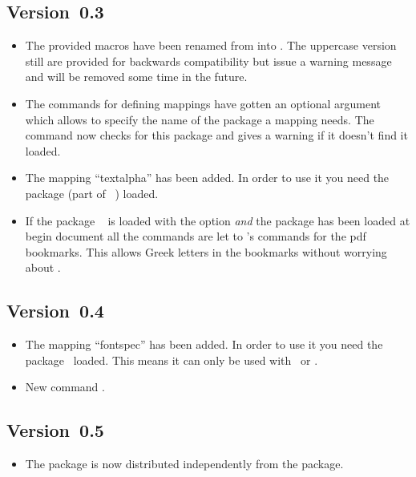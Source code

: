\documentclass[load-preamble+]{cnltx-doc}
\begin{document}
\subsection{Version~0.3}
\begin{itemize}
  \item The provided macros have been renamed from 
    into .  The uppercase version still are provided
    for backwards compatibility but issue a warning message and will be
    removed some time in the future.
  \item The commands for defining mappings have gotten an optional argument
    which allows to specify the name of the package a mapping needs.  The
    command  now checks for this package and gives
    a warning if it doesn't find it loaded.
  \item The mapping ``textalpha'' has been added.  In order to use it you
    need the  package (part of
    ~\cite{bnd:greek-fontenc}) loaded.
  \item If the package ~\cite{pkg:hyperref} is loaded with the
     option \emph{and} the  package has been
    loaded at begin document all the  commands are let
    to 's  commands for the \acs{pdf}
    bookmarks.  This allows Greek letters in the bookmarks without worrying
    about .
\end{itemize}

\subsection{Version~0.4}
\begin{itemize}
  \item The mapping ``fontspec'' has been added.  In order to use it you
    need the  package~\cite{pkg:fontspec} loaded.  This means it
    can only be used with \LuaLaTeX\ or \XeLaTeX.
  \item New command .
\end{itemize}

\subsection{Version~0.5}
\begin{itemize}
  \item The package is now distributed independently from the 
    package.
\end{itemize}
\end{document}
